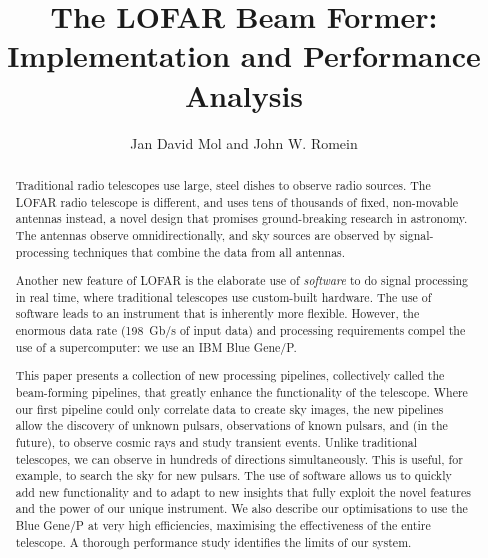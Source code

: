 \documentclass{llncs}
\begin{document}
\newcommand{\comment}[1]{}

\author{Jan David Mol and John W. Romein}
\title{The LOFAR Beam Former: \\ Implementation and Performance Analysis}
\maketitle

\begin{abstract}
Traditional radio telescopes use large, steel dishes to observe radio sources. The LOFAR radio telescope is different, and uses tens of thousands of fixed, non-movable antennas instead, a novel design that promises ground-breaking research in astronomy. The antennas observe omnidirectionally, and sky sources are observed by signal-processing techniques that combine the data from all antennas.

Another new feature of LOFAR is the elaborate use of \emph{software} to do signal processing in real time, where traditional telescopes use custom-built hardware. The use of software leads to an instrument that is inherently more flexible. However, the enormous data rate (198~Gb/s of input data) and processing requirements compel the use of a supercomputer: we use an IBM Blue Gene/P.

This paper presents a collection of new processing pipelines, collectively called the beam-forming pipelines, that greatly enhance the functionality of the telescope. Where our first pipeline could only correlate data to create sky images, the new pipelines allow the discovery of unknown pulsars, observations of known pulsars, and (in the future), to observe cosmic rays and study transient events. Unlike traditional telescopes, we can observe in hundreds of directions simultaneously. This is useful, for example, to search the sky for new pulsars. The use of software allows us to quickly add new functionality and to adapt to new insights that fully exploit the novel features and the power of our unique instrument. We also describe our optimisations to use the Blue Gene/P at very high efficiencies, maximising the effectiveness of the entire telescope. A thorough performance study identifies the limits of our system.
\end{abstract}
\end{document}
